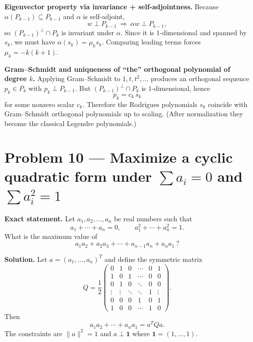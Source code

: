 \documentclass[12pt,a4paper]{article}
\theoremstyle{plain}
\theoremstyle{definition}      %
\begin{document}
\textbf{Eigenvector property via invariance + self-adjointness.}
Because $\alpha(P_{k-1})\subseteq P_{k-1}$ and $\alpha$ is self-adjoint,
\[
w\perp P_{k-1}\ \Rightarrow\ \alpha w\perp P_{k-1},
\]
so $(P_{k-1})^\perp\cap P_k$ is invariant under $\alpha$.
Since it is $1$-dimensional and spanned by $s_k$, we must have $\alpha(s_k)=\mu_k s_k$.
Comparing leading terms forces $\mu_k=-k(k+1)$.

\textbf{Gram--Schmidt and uniqueness of ``the'' orthogonal polynomial of degree $k$.}
Applying Gram--Schmidt to $1,t,t^2,\dots$ produces an orthogonal sequence $p_k\in P_k$ with $p_k\perp P_{k-1}$.
But $(P_{k-1})^\perp\cap P_k$ is $1$-dimensional, hence
\[
p_k = c_k\, s_k
\]
for some nonzero scalar $c_k$.
Therefore the Rodrigues polynomials $s_k$ coincide with Gram--Schmidt orthogonal polynomials up to scaling.
(After normalization they become the classical Legendre polynomials.)



\section{Problem 10 — Maximize a cyclic quadratic form under $\sum a_i=0$ and $\sum a_i^2=1$}

\textbf{Exact statement.}
Let $a_1,a_2,\dots,a_n$ be real numbers such that
\[
a_1+\cdots+a_n=0,\qquad a_1^2+\cdots+a_n^2=1.
\]
What is the maximum value of
\[
a_1a_2+a_2a_3+\cdots+a_{n-1}a_n+a_na_1\ ?
\]

\textbf{Solution.}
Let $a=(a_1,\dots,a_n)^T$ and define the symmetric matrix
\[
Q=\frac12\begin{pmatrix}
	0&1&0&\cdots&0&1\\
	1&0&1&\cdots&0&0\\
	0&1&0&\ddots&0&0\\
	\vdots&\vdots&\ddots&\ddots&1&\vdots\\
	0&0&0&1&0&1\\
	1&0&0&\cdots&1&0
\end{pmatrix}.
\]
Then
\[
a_1a_2+\cdots+a_na_1=a^TQa.
\]
The constraints are $\|a\|^2=1$ and $a\perp \mathbf 1$ where $\mathbf 1=(1,\dots,1)$.
\end{document}

